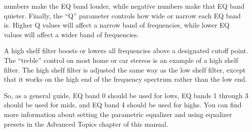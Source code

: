 {\begin{description}
    numbers make the EQ band louder, while negative numbers make that EQ band
    quieter. Finally, the ``Q'' parameter controls how wide or narrow each EQ
    band is. Higher Q values will affect a narrow band of frequencies, while
    lower EQ values will affect a wider band of frequencies.
  \item[Band 4: High shelf filter.]
    A high shelf filter boosts or lowers all frequencies above a designated
    cutoff point. The ``treble'' control on most home or car stereos is an
    example of a high shelf filter. The high shelf filter is adjusted the
    same way as the low shelf filter, except that it works on the high end
    of the frequency spectrum rather than the low end.
  \end{description}
    
  So, as a general guide, EQ band 0 should be used for lows, EQ bands 1 
  through 3 should be used for mids, and EQ band 4 should be used for highs. 
  You can find more information about setting the parametric equalizer and
  using equalizer presets in the Advanced Topics chapter of this manual.  
}
